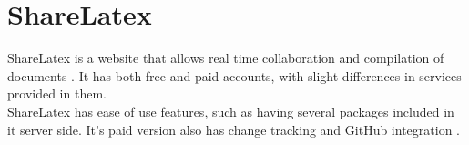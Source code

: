 \section{ShareLatex}

ShareLatex is a website that allows real time collaboration and compilation
of \latex documents \cite{www-hid-sp18-601-slatex-documentation}. It has both 
free and paid accounts, with slight differences
 in services provided in them.\\
 
ShareLatex has ease of use features, such as having several packages included 
in it server side. It's paid version also has change tracking and GitHub
integration \cite{www-hid-sp18-601-slatex-plans}.